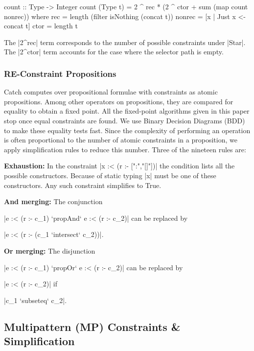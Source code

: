\documentclass[preprint]{sigplanconf}
\newcommand{\para}[1]{\vspace{2mm}\noindent\textbf{#1}}
\begin{document}
\begin{code}
count :: Type -> Integer
count (Type t) = 2 ^ rec * (2 ^ ctor + sum (map count nonrec))
    where
    rec = length (filter isNothing (concat t))
    nonrec = [x | Just x <- concat t]
    ctor = length t
\end{code}

The |2^rec| term corresponds to the number of possible constraints under |Star|. The |2^ctor| term accounts for the case where the selector path is empty.


\subsubsection{RE-Constraint Propositions}
\label{sec:re-propositions}

Catch computes over propositional formulae with constraints as atomic propositions. Among other operators on propositions, they are compared for equality to obtain a fixed point. All the fixed-point algorithms given in this paper stop once equal constraints are found. We use Binary Decision Diagrams (BDD) \cite{lee:bdd} to make these equality tests fast. Since the complexity of performing an operation is often proportional to the number of atomic constraints in a proposition, we apply simplification rules to reduce this number. Three of the nineteen rules are:

\para{Exhaustion:} In the constraint |x :< (r :- [":","[]"])| the condition lists all the possible constructors. Because of static typing |x| must be one of these constructors. Any such constraint simplifies to True.

\para{And merging:} The conjunction \ignore|e :< (r :- c_1) `propAnd` e :< (r :- c_2)| can be replaced by \ignore|e :< (r :- (c_1 `intersect` c_2))|.

\para{Or merging:} The disjunction \ignore|e :< (r :- c_1) `propOr` e :< (r :- c_2)| can be replaced by \ignore|e :< (r :- c_2)| if \ignore|c_1 `subseteq` c_2|.


\subsection{Multipattern (MP) Constraints \& Simplification}
\label{sec:multipattern}
\end{document}

